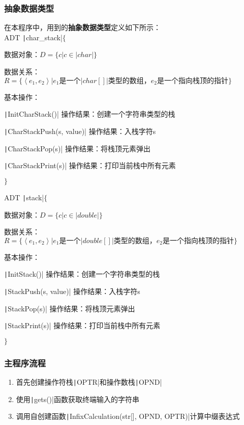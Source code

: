 \documentclass[10pt,a4paper]{article}
\begin{document}
	\subsubsection{抽象数据类型} 
	\noindent 在本程序中，用到的\textbf{抽象数据类型}定义如下所示：\\
	
	\noindent ADT \texttt|char_stack|$\{$
	
	数据对象：$D=\{c | c\in \texttt|char|\}$
	
	数据关系：$R=\{ \left\langle e_1,e_2\right\rangle | e_1\text{是一个}\texttt|char[]|\text{类型的数组，}e_2\text{是一个指向栈顶的指针}\}$
	
	基本操作：
	
	\qquad \texttt|InitCharStack()| 操作结果：创建一个字符串类型的栈
	
	\qquad \texttt|CharStackPush(s, value)| 操作结果：入栈字符s
	
	\qquad \texttt|CharStackPop(s)| 操作结果：将栈顶元素弹出
	
	\qquad \texttt|CharStackPrint(s)| 操作结果：打印当前栈中所有元素
	
	\noindent $\}$
	
	\noindent ADT \texttt|stack|$\{$
	
	数据对象：$D=\{c | c\in \texttt|double|\}$
	
	数据关系：$R=\{ \left\langle e_1,e_2\right\rangle | e_1\text{是一个}\texttt|double[]|\text{类型的数组，}e_2\text{是一个指向栈顶的指针}\}$
	
	基本操作：
	
	\qquad \texttt|InitStack()| 操作结果：创建一个字符串类型的栈
	
	\qquad \texttt|StackPush(s, value)| 操作结果：入栈字符s
	
	\qquad \texttt|StackPop(s)| 操作结果：将栈顶元素弹出
	
	\qquad \texttt|StackPrint(s)| 操作结果：打印当前栈中所有元素
	
	\noindent $\}$
	\subsubsection{主程序流程}
	\noindent
	\begin{enumerate}
		\item  首先创建操作符栈\texttt|OPTR|和操作数栈\texttt|OPND|
		\item 使用\texttt|gets()|函数获取终端输入的字符串
		\item 调用自创建函数\texttt|InfixCalculation(str[], OPND, OPTR)|计算中缀表达式
	\end{enumerate}
\end{document}
